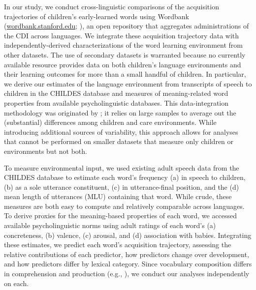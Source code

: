 \documentclass[manuscript]{stjour}
\begin{document}
In our study, we conduct cross-linguistic comparisons of the acquisition
trajectories of children's early-learned words using Wordbank
(\href{http://wordbank.stanford.edu}{wordbank.stanford.edu};
\citealp{frank2016}), an open repository that aggregates administrations
of the CDI across languages. We integrate these acquisition trajectory
data with independently-derived characterizations of the word learning
environment from other datasets. The use of secondary datasets is
warranted because no currently available resource provides data on both
children's language environments and their learning outcomes for more
than a small handful of children. In particular, we derive our estimates
of the language environment from transcripts of speech to children in
the CHILDES database \citep{macwhinney2000} and measures of
meaning-related word properties from available psycholinguistic
databases. This data-integration methodology was originated by
\citet{goodman2008}; it relies on large samples to average out the
(substantial) differences among children and care environments. While
introducing additional sources of variability, this approach allows for
analyses that cannot be performed on smaller datasets that measure only
children or environments but not both.

To measure environmental input, we used existing adult speech data from
the CHILDES database to estimate each word's frequency (a) in speech to
children, (b) as a sole utterance constituent, (c) in utterance-final
position, and the (d) mean length of utterances (MLU) containing that
word. While crude, these measures are both easy to compute and
relatively comparable across languages. To derive proxies for the
meaning-based properties of each word, we accessed available
psycholinguistic norms using adult ratings of each word's (a)
concreteness, (b) valence, (c) arousal, and (d) association with babies.
Integrating these estimates, we predict each word's acquisition
trajectory, assessing the relative contributions of each predictor, how
predictors change over development, and how predictors differ by lexical
category. Since vocabulary composition differs in comprehension and
production (e.g., \citealp{benedict1979}), we conduct our analyses
independently on each.
\end{document}
